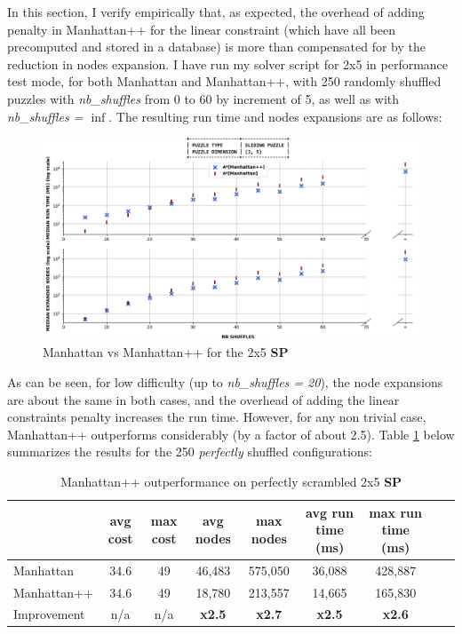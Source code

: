 \label{MHComp}
In this section, I verify empirically that, as expected, the overhead of adding penalty in Manhattan++ for the linear constraint (which have all been precomputed and stored in a database) is more than compensated for by the reduction in nodes expansion. I have run my solver script for 2x5 in performance test mode, for both Manhattan and Manhattan++, with 250 randomly shuffled puzzles with \textit{nb\_shuffles} from 0 to 60 by increment of 5, as well as with \textit{nb\_shuffles = $\inf$}. The resulting run time and nodes expansions are as follows:

\begin{figure}[H]
\centering
\includegraphics[scale=0.40]{./Figures/25SPPerformanceManhattan}
\caption[SP]{Manhattan vs Manhattan++ for the 2x5 \textbf{SP}}
\label{fig:25SPPerformanceManhattan}
\end{figure}

\noindent As can be seen, for low difficulty (up to \textit{nb\_shuffles = 20}), the node expansions are about the same in both cases, and the overhead of adding the linear constraints penalty increases the run time. However, for any non trivial case, Manhattan++ outperforms considerably (by a factor of about 2.5). Table \ref{tab:mppOutperformance} below summarizes the results for the 250 \textit{perfectly} shuffled configurations:



\begin{table}[H]
\begin{center}
\begin{tabular}{l*{7}{c}r}
                              & avg cost  & max cost & avg nodes & max nodes & avg run time (ms) & max run time (ms) \\
\hline
Manhattan                   &  34.6  & 49 & 46,483 & 575,050 & 36,088 & 428,887 \\
Manhattan++              & 34.6 &  49 & 18,780 & 213,557 & 14,665 & 165,830 \\
Improvement               & n/a &  n/a & \textbf{x2.5} & \textbf{x2.7} & \textbf{x2.5} & \textbf{x2.6} \\
\end{tabular}
\caption{\label{tab:mppOutperformance} Manhattan++ outperformance on perfectly scrambled 2x5 \textbf{SP}}
\end{center}
\end{table}






